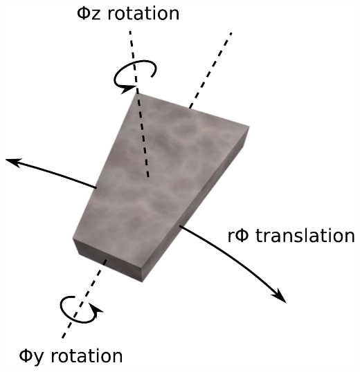 \documentclass[compress]{beamer}
\begin{document}
\begin{frame}
\begin{columns}
\begin{center}
\vspace{0.5 cm}
\includegraphics[width=\linewidth]{csc_coordinates.pdf}
\end{center}
\end{columns}
\end{frame}
\end{document}
